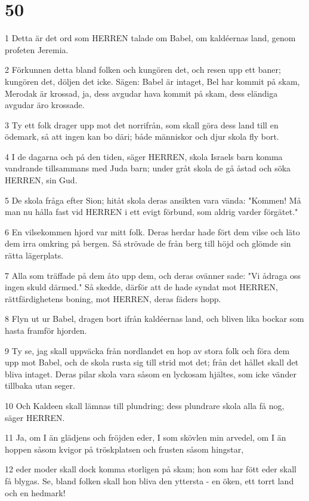 \chapter{50}

\par 1 Detta är det ord som HERREN talade om Babel, om kaldéernas land, genom profeten Jeremia.
\par 2 Förkunnen detta bland folken och kungören det, och resen upp ett baner; kungören det, döljen det icke. Sägen: Babel är intaget, Bel har kommit på skam, Merodak är krossad, ja, dess avgudar hava kommit på skam, dess eländiga avgudar äro krossade.
\par 3 Ty ett folk drager upp mot det norrifrån, som skall göra dess land till en ödemark, så att ingen kan bo däri; både människor och djur skola fly bort.
\par 4 I de dagarna och på den tiden, säger HERREN, skola Israels barn komma vandrande tillsammans med Juda barn; under gråt skola de gå åstad och söka HERREN, sin Gud.
\par 5 De skola fråga efter Sion; hitåt skola deras ansikten vara vända: "Kommen! Må man nu hålla fast vid HERREN i ett evigt förbund, som aldrig varder förgätet."
\par 6 En vilsekommen hjord var mitt folk. Deras herdar hade fört dem vilse och läto dem irra omkring på bergen. Så strövade de från berg till höjd och glömde sin rätta lägerplats.
\par 7 Alla som träffade på dem åto upp dem, och deras ovänner sade: "Vi ådraga oss ingen skuld därmed." Så skedde, därför att de hade syndat mot HERREN, rättfärdighetens boning, mot HERREN, deras fäders hopp.
\par 8 Flyn ut ur Babel, dragen bort ifrån kaldéernas land, och bliven lika bockar som hasta framför hjorden.
\par 9 Ty se, jag skall uppväcka från nordlandet en hop av stora folk och föra dem upp mot Babel, och de skola rusta sig till strid mot det; från det hållet skall det bliva intaget. Deras pilar skola vara såsom en lyckosam hjältes, som icke vänder tillbaka utan seger.
\par 10 Och Kaldeen skall lämnas till plundring; dess plundrare skola alla få nog, säger HERREN.
\par 11 Ja, om I än glädjens och fröjden eder, I som skövlen min arvedel, om I än hoppen såsom kvigor på tröskplatsen och frusten såsom hingstar,
\par 12 eder moder skall dock komma storligen på skam; hon som har fött eder skall få blygas. Se, bland folken skall hon bliva den yttersta - en öken, ett torrt land och en hedmark!
